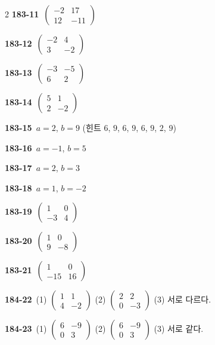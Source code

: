 \documentclass[10pt,a4paper]{article}
\begin{document}
\begin{multicols}{2}
\noindent\textbf{183-11}\ $\begin{pmatrix} -2 & 17 \\ 12 & -11 \end{pmatrix}$\par
\noindent\textbf{183-12}\ $\begin{pmatrix} -2 & 4 \\ 3 & -2 \end{pmatrix}$\par
\noindent\textbf{183-13}\ $\begin{pmatrix} -3 & -5 \\ 6 & 2 \end{pmatrix}$\par
\noindent\textbf{183-14}\ $\begin{pmatrix} 5 & 1 \\ 2 & -2 \end{pmatrix}$\par
\noindent\textbf{183-15}\ $a=2$, $b=9$ (힌트 $6$, $9$, $6$, $9$, $6$, $9$, $2$, $9$)\par
\noindent\textbf{183-16}\ $a=-1$, $b=5$\par
\noindent\textbf{183-17}\ $a=2$, $b=3$\par
\noindent\textbf{183-18}\ $a=1$, $b=-2$\par
\noindent\textbf{183-19}\ $\begin{pmatrix} 1 & 0 \\ -3 & 4 \end{pmatrix}$\par
\noindent\textbf{183-20}\ $\begin{pmatrix} 1 & 0 \\ 9 & -8 \end{pmatrix}$\par
\noindent\textbf{183-21}\ $\begin{pmatrix} 1 & 0 \\ -15 & 16 \end{pmatrix}$\par
\noindent\textbf{184-22}\ (1) $\begin{pmatrix} 1 & 1 \\ 4 & -2 \end{pmatrix}$ (2) $\begin{pmatrix} 2 & 2 \\ 0 & -3 \end{pmatrix}$ (3) 서로 다르다.\par
\noindent\textbf{184-23}\ (1) $\begin{pmatrix} 6 & -9 \\ 0 & 3 \end{pmatrix}$ (2) $\begin{pmatrix} 6 & -9 \\ 0 & 3 \end{pmatrix}$ (3) 서로 같다.\par

\end{multicols}
\end{document}
